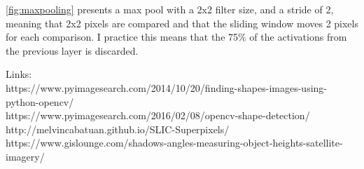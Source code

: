 \autoref{fig:maxpooling} presents a max pool with a 2x2 filter size, and a stride of 2, meaning that 2x2 pixels are compared and that the sliding window moves 2 pixels for each comparison. I practice this means that the 75\% of the activations from the previous layer is discarded.

Links:\\
https://www.pyimagesearch.com/2014/10/20/finding-shapes-images-using-python-opencv/\\
https://www.pyimagesearch.com/2016/02/08/opencv-shape-detection/
\\
http://melvincabatuan.github.io/SLIC-Superpixels/
\\
https://www.gislounge.com/shadows-angles-measuring-object-heights-satellite-imagery/
\\

